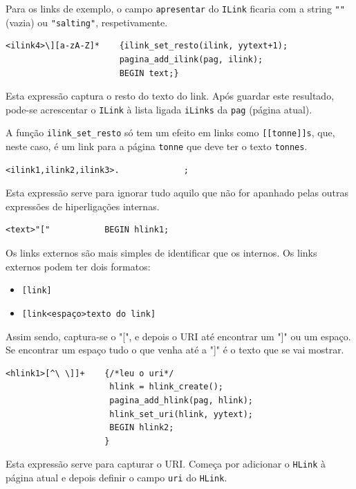 \documentclass[11pt, a4paper, oneside]{article}
\begin{document}
Para os links de exemplo, o campo \texttt{apresentar} do \texttt{ILink} ficaria com a string \texttt{""} (vazia) ou \texttt{"salting"}, respetivamente.

\begin{verbatim}
<ilink4>\][a-zA-Z]*    {ilink_set_resto(ilink, yytext+1);
                       pagina_add_ilink(pag, ilink);
                       BEGIN text;}
\end{verbatim}

Esta expressão captura o resto do texto do link. Após guardar este resultado, pode-se acrescentar o \texttt{ILink} à lista ligada \texttt{iLinks} da \texttt{pag} (página atual).

A função \texttt{ilink\_set\_resto} só tem um efeito em links como \texttt{[[tonne]]s}, que, neste caso, é um link para a página \texttt{tonne} que deve ter o texto \texttt{tonnes}.


\begin{verbatim}
<ilink1,ilink2,ilink3>.             ;
\end{verbatim}

Esta expressão serve para ignorar tudo aquilo que não for apanhado pelas outras expressões de hiperligações internas.


\begin{verbatim}
<text>"["           BEGIN hlink1;
\end{verbatim}



Os links externos são mais simples de identificar que os internos. Os links externos podem ter dois formatos:

\begin{itemize}
\item \texttt{[link]}
\item \texttt{[link<espaço>texto do link]}
\end{itemize}

Assim sendo, captura-se o "[", e depois o URI até encontrar um "]" ou um espaço. Se encontrar um espaço tudo o que venha até a "]" é o texto que se vai mostrar.

\begin{verbatim}
<hlink1>[^\ \]]+    {/*leu o uri*/
                     hlink = hlink_create();
                     pagina_add_hlink(pag, hlink);
                     hlink_set_uri(hlink, yytext);
                     BEGIN hlink2;
                    }
\end{verbatim}

Esta expressão serve para capturar o URI. Começa por adicionar o \texttt{HLink} à página atual e depois definir o campo \texttt{uri} do \texttt{HLink}.
\end{document}
